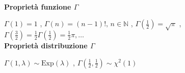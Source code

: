 \documentclass[openany]{book} %
\begin{document}
\blindtext
\\

\textbf{Proprietà funzione $\Gamma$}

$\Gamma(1)=1$ , \quad $\Gamma(n)=(n-1)!,\,n\in \mathbb{N}$ , \quad $\Gamma(\frac{1}{2})=\sqrt {\pi}$ , \quad $\Gamma(\frac{3}{2})=\frac{1}{2}\Gamma(\frac{1}{2})=\frac{1}{2}\pi,\dots$
\\

\textbf{Proprietà distribuzione $\Gamma$}

$\Gamma(1,\lambda) \sim \text{Exp}(\lambda)$ , \quad $\Gamma(\frac{1}{2},\frac{1}{2})\sim\chi^2(1)$ 
\end{document}
